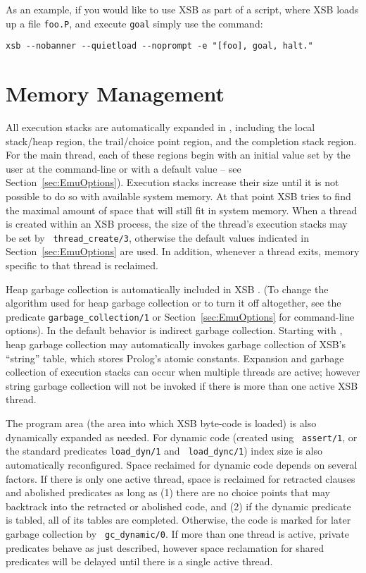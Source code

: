 As an example, if you would like to use XSB as part of a script, where
XSB loads up a file {\tt foo.P}, and execute {\tt goal} simply
use the command: 
\begin{verbatim}
xsb --nobanner --quietload --noprompt -e "[foo], goal, halt."
\end{verbatim}


\section{Memory Management}\label{memory_management}
 
All execution stacks are automatically expanded in \version{},
including the local stack/heap region, the trail/choice point region,
and the completion stack region.  For the main thread, each of these
regions begin with an initial value set by the user at the
command-line or with a default value -- see
Section~\ref{sec:EmuOptions}).  Execution stacks increase their size
until it is not possible to do so with available system memory.  At
that point XSB tries to find the maximal amount of space that will
still fit in system memory.  When a thread is created within an XSB
process, the size of the thread's execution stacks may be set by {\tt
  thread\_create/3}, otherwise the default values indicated in
Section~\ref{sec:EmuOptions} are used.  In addition, whenever a thread
exits, memory specific to that thread is reclaimed.

Heap garbage collection is automatically included in XSB
\cite{CaSC01,CATmem@ISMM-98}.  (To change the algorithm used for heap
garbage collection or to turn it off altogether, see the predicate
{\tt garbage\_collection/1} or Section~\ref{sec:EmuOptions} for
command-line options).  In \version{} the default behavior is indirect
garbage collection.  Starting with \version{}, heap garbage collection
may automatically invokes garbage collection of XSB's ``string''
table, which stores Prolog's atomic constants.  Expansion and garbage
collection of execution stacks can occur when multiple threads are
active; however string garbage collection will not be invoked if there
is more than one active XSB thread.

The program area (the area into which XSB byte-code is loaded) is also
dynamically expanded as needed.  For dynamic code (created using {\tt
  assert/1}, or the standard predicates {\tt load\_dyn/1} and {\tt
  load\_dync/1}) index size is also automatically reconfigured.  Space
reclaimed for dynamic code depends on several factors.  If there is
only one active thread, space is reclaimed for retracted clauses and
abolished predicates as long as (1) there are no choice points that
may backtrack into the retracted or abolished code, and (2) if the
dynamic predicate is tabled, all of its tables are completed.
Otherwise, the code is marked for later garbage collection by {\tt
  gc\_dynamic/0}.  If more than one thread is active, private
predicates behave as just described, however space reclamation for
shared predicates will be delayed until there is a single active
thread.

